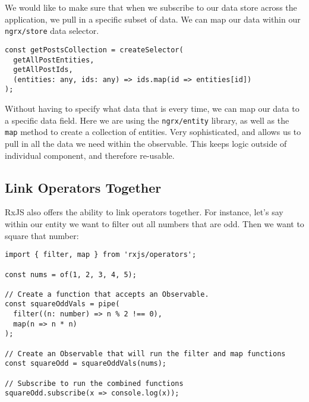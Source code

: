 We would like to make sure that when we subscribe to our data store 
across the application, we pull in a specific subset of data. We can map 
our data within our \lstinline{ngrx/store} data selector. 

\begin{lstlisting}[caption=settings.selector.ts]
const getPostsCollection = createSelector(
  getAllPostEntities,
  getAllPostIds,
  (entities: any, ids: any) => ids.map(id => entities[id])
);
\end{lstlisting}

Without having to specify what data that is every time, we can map our data 
to a specific data field. Here we are using the \lstinline{ngrx/entity} 
library, as well as the \lstinline{map} method to create a collection of 
entities. Very sophisticated, and allows us to pull in all the data we need
within the observable. This keeps logic outside of individual 
component, and therefore re-usable.

\subsection{Link Operators Together}
RxJS also offers the ability to link operators together. For instance, let's 
say within our entity we want to filter out all numbers that are odd. Then 
we want to square that number:

\begin{lstlisting}
import { filter, map } from 'rxjs/operators';

const nums = of(1, 2, 3, 4, 5);

// Create a function that accepts an Observable.
const squareOddVals = pipe(
  filter((n: number) => n % 2 !== 0),
  map(n => n * n)
);

// Create an Observable that will run the filter and map functions
const squareOdd = squareOddVals(nums);

// Subscribe to run the combined functions
squareOdd.subscribe(x => console.log(x));  
\end{lstlisting}


